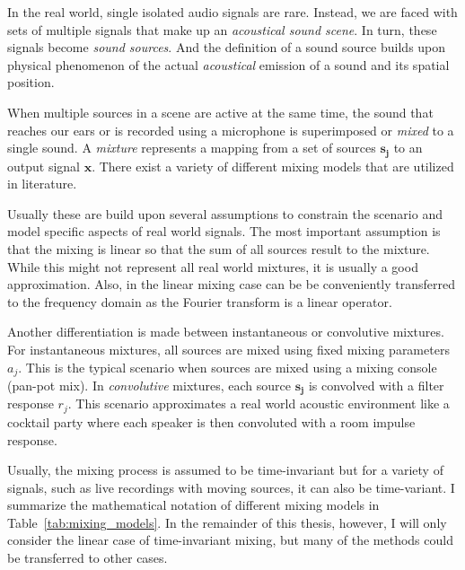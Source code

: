 In the real world, single isolated audio signals are rare.
Instead, we are faced with sets of multiple signals that make up an \emph{acoustical sound scene}.
In turn, these signals become \emph{sound sources}.
And the definition of a sound source builds upon physical
phenomenon of the actual \emph{acoustical} emission of a sound and its
spatial position.
\par
When multiple sources in a scene are active at the same time, the sound that reaches our ears or is recorded using a microphone is superimposed or \emph{mixed} to a single sound.
A \emph{mixture} represents a mapping from a set of sources \(\mathbf{s_j}\) to an output signal \(\mathbf{x}\).
There exist a variety of different mixing models that are utilized in literature.
\par
Usually these are build upon several assumptions to constrain the scenario and model specific aspects of real world signals.
The most important assumption is that the mixing is linear so that the sum of all sources result to the mixture.
While this might not represent all real world mixtures, it is usually a good approximation.
Also, in the linear mixing case can be be conveniently transferred to the frequency domain as the Fourier transform is a linear operator.
\par
Another differentiation is made between instantaneous or convolutive mixtures.
For instantaneous mixtures, all sources are mixed using fixed mixing parameters \(a_j\).
This is the typical scenario when sources are mixed using a mixing console (pan-pot mix).
In \emph{convolutive} mixtures, each source \(\mathbf{s_j}\) is convolved with a filter response \(r_j\).
This scenario approximates a real world acoustic environment like a cocktail party where each speaker is then convoluted with a room impulse response.
\par
Usually, the mixing process is assumed to be time-invariant but for a variety of signals, such as live recordings with moving sources, it can also be time-variant.
I summarize the mathematical notation of different mixing models in Table~\ref{tab:mixing_models}.
In the remainder of this thesis, however, I will only consider the linear case of  time-invariant mixing, but many of the methods could be transferred to other cases.

